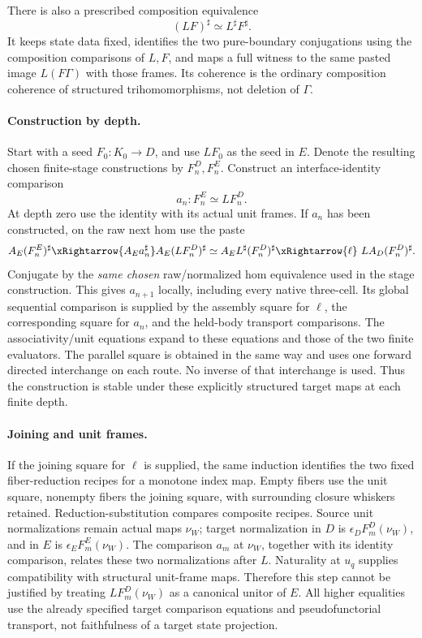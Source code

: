 \documentclass{article}
\begin{document}
There is also a prescribed composition equivalence
\[
 (LF)^\sharp\simeq L^\sharp F^\sharp.
\]
It keeps state data fixed, identifies the two pure-boundary conjugations using the composition comparisons of $L,F$, and maps a full witness to the same pasted image $L(F\Gamma)$ with those frames. Its coherence is the ordinary composition coherence of structured trihomomorphisms, not deletion of $\Gamma$.

\paragraph{Construction by depth.} Start with a seed $F_0:K_0\to D$, and use $LF_0$ as the seed in $E$. Denote the resulting chosen finite-stage constructions by $F_n^D,F_n^E$. Construct an interface-identity comparison
\[
 a_n:F_n^E\simeq L F_n^D.
\]
At depth zero use the identity with its actual unit frames. If $a_n$ has been constructed, on the raw next hom use the paste
\[
 A_E(F_n^E)^\sharp
 \xRightarrow{A_E a_n^\sharp}
 A_E(LF_n^D)^\sharp
 \simeq A_E L^\sharp(F_n^D)^\sharp
 \xRightarrow{\ell}\ L A_D(F_n^D)^\sharp.
\]
Conjugate by the \emph{same chosen} raw/normalized hom equivalence used in the stage construction. This gives $a_{n+1}$ locally, including every native three-cell. Its global sequential comparison is supplied by the assembly square for $\ell$, the corresponding square for $a_n$, and the held-body transport comparisons. The associativity/unit equations expand to these equations and those of the two finite evaluators. The parallel square is obtained in the same way and uses one forward directed interchange on each route. No inverse of that interchange is used. Thus the construction is stable under these explicitly structured target maps at each finite depth.

\paragraph{Joining and unit frames.} If the joining square for $\ell$ is supplied, the same induction identifies the two fixed fiber-reduction recipes for a monotone index map. Empty fibers use the unit square, nonempty fibers the joining square, with surrounding closure whiskers retained. Reduction-substitution compares composite recipes. Source unit normalizations remain actual maps $\nu_W$; target normalization in $D$ is $\epsilon_D F_m^D(\nu_W)$, and in $E$ is $\epsilon_E F_m^E(\nu_W)$. The comparison $a_m$ at $\nu_W$, together with its identity comparison, relates these two normalizations after $L$. Naturality at $u_q$ supplies compatibility with structural unit-frame maps. Therefore this step cannot be justified by treating $L F_m^D(\nu_W)$ as a canonical unitor of $E$. All higher equalities use the already specified target comparison equations and pseudofunctorial transport, not faithfulness of a target state projection.
\end{document}
